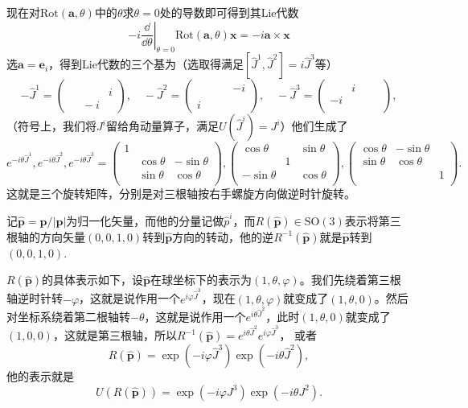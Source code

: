 \documentclass[9pt]{extbook}
\begin{document}
现在对$\mathrm{Rot}(\bm{a},\theta)$中的$\theta$求$\theta=0$处的导数即可得到其Lie代数
\[
-i\left.\frac{\dd}{\dd \theta}\right|_{\theta=0}\mathrm{Rot}(\bm{a},\theta)\bm{x}=-i\bm{a}\times\bm{x}
\]
选$\bm{a}=\bm{e}_i$，得到Lie代数的三个基为（选取得满足$[\hat{J}^1,\hat{J}^2]=i\hat{J}^3$等）
\[
-\hat{J}^1=\begin{pmatrix}
		&&\\
		&&i\\
		&\phantom{l}-i&
	 \end{pmatrix},\quad
-\hat{J}^2=\begin{pmatrix}
		&&-i\\
		&&\\
		i\phantom{-}&&
	 \end{pmatrix},\quad
-\hat{J}^3=\begin{pmatrix}
		&i\phantom{-}&\\
		-i&&\\
		&&
	 \end{pmatrix},
\]
（符号上，我们将$J^i$留给角动量算子，满足$U(\hat{J}^i)=J^i$）他们生成了
\[
e^{-i\theta \hat{J}^1},e^{-i\theta \hat{J}^2},e^{-i\theta \hat{J}^3}=
\begin{pmatrix}
 1 && \\
 & \cos \theta& -\sin \theta \\
 & \sin \theta & \cos \theta \\
\end{pmatrix}
,
\begin{pmatrix}
\cos \theta & &\sin \theta\\
 & 1 & \\
-\sin \theta & & \cos \theta \\
\end{pmatrix}
,
\begin{pmatrix}
\cos \theta & -\sin \theta &\\
\sin \theta&\cos \theta &\\
 & & 1 \\
\end{pmatrix}.
\]
这就是三个旋转矩阵，分别是对三根轴按右手螺旋方向做逆时针旋转。

记$\hat{\bm{p}}=\bm{p}/|\bm{p}|$为归一化矢量，而他的分量记做$\hat{p}^i$，而$R(\hat{\bm{p}})\in\mathrm{SO}(3)$表示将第三根轴的方向矢量$(0,0,1,0)$转到$\hat{\bm{p}}$方向的转动，他的逆$R^{-1}(\hat{\bm{p}})$就是$\hat{\bm{p}}$转到$(0,0,1,0)$.

$R(\hat{\bm{p}})$的具体表示如下，设$\hat{\bm{p}}$在球坐标下的表示为$(1,\theta,\varphi)$。我们先绕着第三根轴逆时针转$-\varphi$，这就是说作用一个$e^{i\varphi \hat{J}^3}$，现在$(1,\theta,\varphi)$就变成了$(1,\theta,0)$。然后对坐标系绕着第二根轴转$-\theta$，这就是说作用一个$e^{i\theta \hat{J}^2}$，此时$(1,\theta,0)$就变成了$(1,0,0)$，这就是第三根轴，所以$R^{-1}(\hat{\bm{p}})=e^{i\theta \hat{J}^2}e^{i\varphi \hat{J}^3}$，
或者
\[
	R(\hat{\bm{p}})=\exp(-i\varphi \hat{J}^3)\exp(-i\theta \hat{J}^2),
\]
他的表示就是
\[
	U(R(\hat{\bm{p}}))=\exp(-i\varphi J^3)\exp(-i\theta J^2).
\]
\end{document}
